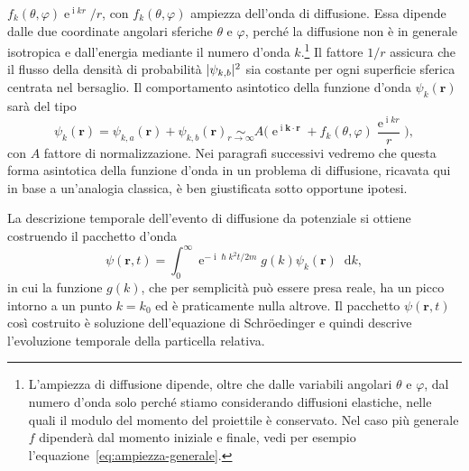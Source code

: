 \documentclass[a4paper,fleqn,twoside,12pt]{article}
\renewcommand{\phi}{\varphi}
\newcommand*{\dd}{\mathop{}\!\mathrm{d}} %
\DeclareMathOperator{\e}{\mathrm{e}} %
\DeclareMathOperator{\uimm}{\mathrm{i}} %
\DeclarePairedDelimiter{\abs}{\lvert}{\rvert}
\begin{document}
$f_{k}(\theta,\phi)\e^{\uimm kr}/r$, con $f_{k}(\theta,\phi)$ ampiezza dell'onda
di diffusione.  Essa dipende dalle due coordinate angolari sferiche $\theta$ e
$\phi$, perché la diffusione non è in generale isotropica e dall'energia
mediante il numero d'onda
$k$.\footnote{L'ampiezza di diffusione dipende, oltre che dalle variabili
  angolari $\theta$ e $\phi$, dal numero d'onda solo perché stiamo considerando
  diffusioni elastiche, nelle quali il modulo del momento del proiettile è
  conservato.  Nel caso più generale $f$ dipenderà dal momento iniziale e
  finale, vedi per esempio l'equazione~\eqref{eq:ampiezza-generale}.}
Il fattore $1/r$ assicura che il flusso della densità di probabilità
$\abs{\psi_{k,b}}^{2}$ sia costante per ogni superficie sferica centrata nel
bersaglio.  Il comportamento asintotico della funzione d'onda $\psi_{k}(\bm{r})$
sarà del tipo
\begin{equation}
  \label{eq:forma-asintotica}
  \psi_{k}(\bm{r}) = \psi_{k,a}(\bm{r}) + \psi_{k,b}(\bm{r}) \underset{r \to
    \infty}{\sim} A \bigg( \e^{\uimm \bm{k}\cdot\bm{r}} +
  f_{k}(\theta,\phi)\frac{\e^{\uimm kr}}{r} \bigg),
\end{equation}
con $A$ fattore di normalizzazione.  Nei paragrafi successivi vedremo che questa
forma asintotica della funzione d'onda in un problema di diffusione, ricavata
qui in base a un'analogia classica, è ben giustificata sotto opportune ipotesi.

La descrizione temporale dell'evento di diffusione da potenziale si ottiene
costruendo il pacchetto d'onda
\begin{equation}
  \psi(\bm{r},t) = \int_{0}^{\infty} \e^{-\uimm \hslash k^{2} t/2m} g(k)
  \psi_{k}(\bm{r}) \dd k,
\end{equation}
in cui la funzione $g(k)$, che per semplicità può essere presa reale, ha un
picco intorno a un punto $k = k_{0}$ ed è praticamente nulla altrove.  Il
pacchetto $\psi(\bm{r},t)$ così costruito è soluzione dell'equazione di
Schröedinger e quindi descrive l'evoluzione temporale della particella relativa.

\end{document}
